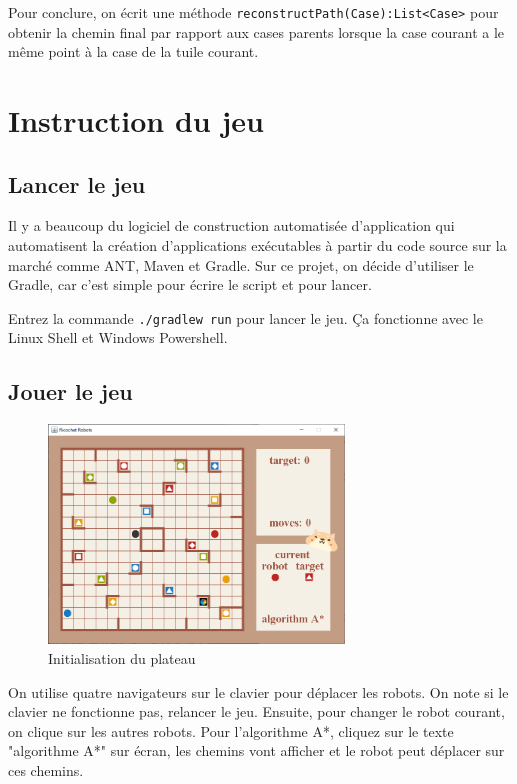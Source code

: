 \documentclass[12pt, pdflatex]{article}
\begin{document}
    Pour conclure, on écrit une méthode \texttt{reconstructPath(Case):List<Case>} pour obtenir la chemin final par rapport aux cases parents lorsque la case courant a le même point à la case de la tuile courant.




\pagebreak

\section{Instruction du jeu}
    \subsection{Lancer le jeu}
    Il y a beaucoup du logiciel de construction automatisée d’application qui automatisent la création d'applications exécutables à partir du code source sur la marché comme ANT, Maven et Gradle. Sur ce projet, on décide d'utiliser le Gradle, car c'est simple pour écrire le script et pour lancer.

    Entrez la commande \texttt{./gradlew run} pour lancer le jeu. Ça fonctionne avec le Linux Shell et Windows Powershell.

    \subsection{Jouer le jeu}
    
    \begin{figure}[H]
        \centering
        \includegraphics[width=0.7\textwidth]{sources/cap-1.png}
        \caption{Initialisation du plateau}
    \end{figure}

    On utilise quatre navigateurs sur le clavier pour déplacer les robots. On note si le clavier ne fonctionne pas, relancer le jeu. Ensuite, pour changer le robot courant, on clique sur les autres robots. Pour l'algorithme A*, cliquez sur le texte "algorithme A*" sur écran, les chemins vont afficher et le robot peut déplacer sur ces chemins.
\end{document}
